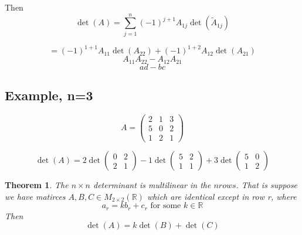 \documentclass{article}
\newtheorem{theorem}{Theorem}[section]
\newtheorem{one minute paper}[theorem]{One Minute Paper}
\begin{document}
Then
\begin{equation}
    \det(A) = \sum_{j=1}^{n}(-1)^{j+1}A_{1j}\det(\tilde{A}_{1j})
\end{equation}

\begin{equation}
    = (-1)^{1 + 1}A_{11}\det(A_{22}) + (-1)^{1 + 2}A_{12}\det(A_{21})
\end{equation}
\begin{equation}
    A_{11}A_{22} - A_{12}A_{21}
\end{equation}
\begin{equation}
    ad - bc
\end{equation}

\subsection*{Example, n=3}

\begin{equation}
    A = \begin{pmatrix}
        2 & 1 & 3 \\
        5 & 0 & 2 \\
        1 & 2 & 1
    \end{pmatrix}
\end{equation}

\begin{equation}
    \det(A) = 2\det\begin{pmatrix}
        0 & 2 \\
        2 & 1
    \end{pmatrix} - 1\det\begin{pmatrix}
        5 & 2 \\
        1 & 1 
    \end{pmatrix} + 3\det\begin{pmatrix}
        5 & 0 \\
        1 & 2
    \end{pmatrix}
\end{equation}

\begin{theorem}
    The $n \times n$ determinant is multilinear in the $n rows$. That is suppose we have matirces $A,B,C \in M_{2 \times 2}(\mathbb{R})$ which are 
    identical except in row r, where 
    \begin{equation}
        a_r = kb_r + c_r \text{ for some $k \in \mathbb{R}$}
    \end{equation}
    Then 
    \begin{equation}
        \det(A) = k\det(B) + \det(C)
    \end{equation}
\end{theorem}
\end{document}
